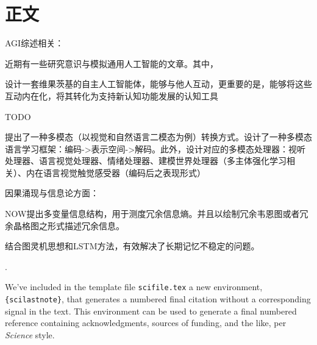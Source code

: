 \documentclass[12pt]{ctexart}
\newcounter{lastnote}
\newenvironment{scilastnote}{%
\setcounter{lastnote}{\value{enumiv}}%
\addtocounter{lastnote}{+1}%
\begin{list}%
{\arabic{lastnote}.}
{\setlength{\leftmargin}{.22in}}
{\setlength{\labelsep}{.5em}}}
{\end{list}}
\begin{document}
\section*{正文}

AGI综述相关：

近期有一些研究意识与模拟通用人工智能的文章。其中，

\citep{Reser_2022}设计一套维果茨基的自主人工智能体，能够与他人互动，更重要的是，能够将这些互动内在化，将其转化为支持新认知功能发展的认知工具

TODO\citep{Colas.Karch.ea_2022}

\citep{Liang_2022}提出了一种多模态（以视觉和自然语言二模态为例）转换方式。设计了一种多模态语言学习框架：编码->表示空间->解码。此外，设计对应的多模态处理器：视听处理器、语言视觉处理器、情绪处理器、建模世界处理器（多主体强化学习相关）、内在语言视觉触觉感受器（编码后之表现形式）


因果涌现与信息论方面：

NOW\citep{williams2010nonnegative}提出多变量信息结构，用于测度冗余信息熵。并且以绘制冗余韦恩图或者冗余晶格图之形式描述冗余信息。

\citep{Graves.Wayne.ea_2014_NeuralTuringMachines}结合图灵机思想和LSTM方法，有效解决了长期记忆不稳定的问题。






% 





\begin{scilastnote}
\item We've included in the template file \texttt{scifile.tex} a new
environment, \texttt{\{scilastnote\}}, that generates a numbered final
citation without a corresponding signal in the text.  This environment
can be used to generate a final numbered reference containing
acknowledgments, sources of funding, and the like, per {\it Science\/}
style.
\end{scilastnote}
\end{document}
